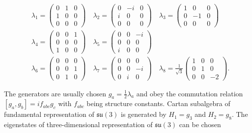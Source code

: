 \begin{align}
  &\lambda_1 = \begin{pmatrix} 0 & 1 & 0 \\ 1 & 0 & 0 \\ 0 & 0 & 0 \end{pmatrix}
  \quad
  \lambda_2 = \begin{pmatrix} 0 & -i & 0 \\ i & 0 & 0 \\ 0 & 0 & 0 \end{pmatrix}
  \quad
  \lambda_3 = \begin{pmatrix} 1 & 0 & 0 \\ 0 & -1& 0 \\ 0 & 0 & 0 \end{pmatrix}
  \nonumber \\
  &\lambda_4 = \begin{pmatrix} 0 & 0 & 1 \\ 0 & 0 & 0 \\ 1 & 0 & 0 \end{pmatrix}
  \quad
  \lambda_5 = \begin{pmatrix} 0 & 0 & -i\\ 0 & 0 & 0 \\ i & 0 & 0 \end{pmatrix}
  \label{eq:GellMannMatrices} \\
  &\lambda_6 = \begin{pmatrix} 0 & 0 & 0 \\ 0 & 0 & 1 \\ 0 & 1 & 0 \end{pmatrix}
  \quad
  \lambda_7 = \begin{pmatrix} 0 & 0 & 0 \\ 0 & 0 & -i\\ 0 & i & 0 \end{pmatrix}
  \quad
  \lambda_8 = \frac{1}{\sqrt{3}} \begin{pmatrix} 1 & 0 & 0 \\ 0 & 1 & 0 \\ 
                                                              0 & 0 & -2 \end{pmatrix}.
  \nonumber
\end{align}

The generators are usually chosen $g_a = \frac{1}{2} \lambda_a$ and obey the
commutation relation $[g_a,g_b]=if_{abc}g_c$ with $f_{abc}$ being structure
constants. Cartan subalgebra of fundamental representation of $\mathfrak{su}(3)$
is generated by $H_1=g_3$ and $H_2=g_8$. The eigenstates of three-dimensional
representation of $\mathfrak{su}(3)$ can be chosen 

